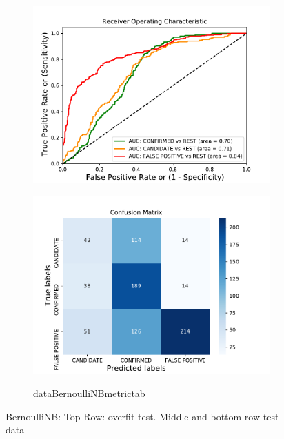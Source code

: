 \begin{figure}[H]
\begin{subfigure}{.49\textwidth}
                \includegraphics[width = 1\textwidth]{data/BernoulliNB_roc.pdf}
                \end{subfigure}
                \begin{subfigure}{.49\textwidth}
                \includegraphics[width = 1\textwidth]{data/BernoulliNB_cm.pdf}
                \end{subfigure}
                \begin{subfigure}{1\textwidth}
                \csname dataBernoulliNBmetrictab\endcsname
                \end{subfigure}
                \caption{BernoulliNB: Top Row: overfit test. Middle and bottom row test data}
                \label{fig:data/BernoulliNB_roc}
                \end{figure}